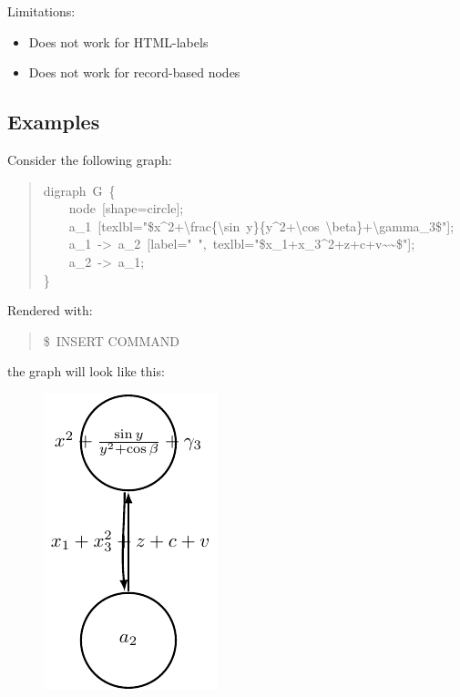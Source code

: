 \documentclass[10pt,a4paper,english]{article}
\begin{document}
Limitations:
\begin{itemize}
\item {} 
Does not work for HTML-labels

\item {} 
Does not work for record-based nodes

\end{itemize}



\hypertarget{examples}{}
\subsection*{Examples}
\label{examples}

Consider the following graph:
\begin{quote}{\ttfamily \raggedright \noindent
digraph~G~{\{}~\\
~~~~node~{[}shape=circle{]};~\\
~~~~a{\_}1~{[}texlbl="{\$}x{\textasciicircum}2+{\textbackslash}frac{\{}{\textbackslash}sin~y{\}}{\{}y{\textasciicircum}2+{\textbackslash}cos~{\textbackslash}beta{\}}+{\textbackslash}gamma{\_}3{\$}"{]};~\\
~~~~a{\_}1~->~a{\_}2~{[}label="~",~texlbl="{\$}x{\_}1+x{\_}3{\textasciicircum}2+z+c+v{\textasciitilde}{\textasciitilde}{\$}"{]};~\\
~~~~a{\_}2~->~a{\_}1;~\\
{\}}
}\end{quote}

Rendered with:
\begin{quote}{\ttfamily \raggedright \noindent
{\$}~INSERT COMMAND
}\end{quote}

the graph will look like this:
\begin{figure}[H]
\centering

\includegraphics{pdf/preproc1a}
\end{figure}
\end{document}
